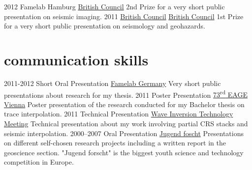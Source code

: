 \documentclass[]{friggeri-cv} %
\begin{document}
\begin{entrylist}
\entry
{2012}
{Famelab Hamburg}
{\href{http://www.famelab-germany.de}{British Council}}
{2nd Prize for a very short public presentation on seismic imaging.}
\entry
{2011}
{\href{http://www.famelab-germany.de}{British Council}}
{\href{http://www.famelab-germany.de}{British Council}}
{1st Prize for a very short public presentation on seismology and geohazards.}
\end{entrylist}

\section{communication skills}

\begin{entrylist}
\entry
{2011-2012}
{Short Oral Presentation}
{\href{http://www.famelab-germany.de}{Famelab Germany}}
{Very short public presentations about research for my thesis.}
\entry
{2011}
{Poster Presentation}
{\href{http://earthdoc.eage.org/publication/publicationdetails/?publication=50683}{73\textsuperscript{rd} EAGE Vienna}}
{Poster presentation of the research conducted for my Bachelor thesis on trace interpolation.}
\entry
{2011}
{Technical Presentation}
{\href{http:/www.wit-consortium.de}{Wave Inversion Technology Meeting}}
{Technical presentation about my work involving partial CRS stacks and seismic interpolation.}
\entry
{2000--2007}
{Oral Presentation}
{\href{http://www.jugend-forscht.de/}{Jugend foscht}}
{Presentations on different self-chosen research projects including a written report in the geoscience section. "Jugend forscht" is the biggest youth science and technology competition in Europe.}
\end{entrylist}

\end{document}
